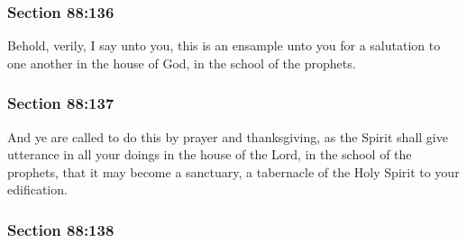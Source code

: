 
	\subsubsection{Section 88:136} %
		\label{DC88-136}

		Behold, verily, I say unto you, this is an ensample unto you for a salutation to one another in the house of God, in the school of the prophets.


	\subsubsection{Section 88:137} %
		\label{DC88-137}

		And ye are called to do this by prayer and thanksgiving, as the Spirit shall give utterance in all your doings in the house of the Lord, in the school of the prophets, that it may become a sanctuary, a tabernacle of the Holy Spirit to your edification.


	\subsubsection{Section 88:138} %
		\label{DC88-138}

